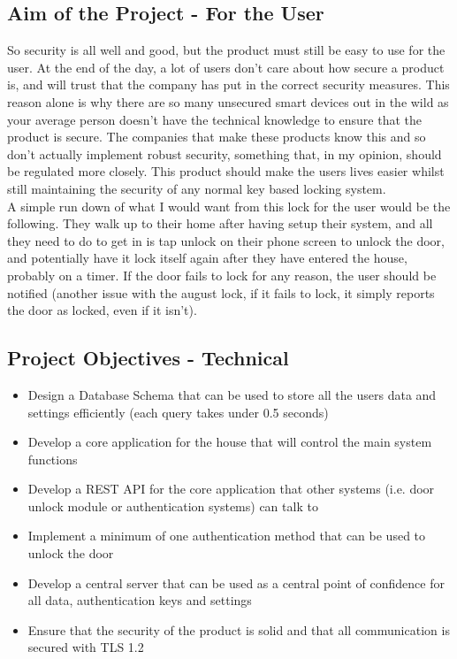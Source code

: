 \subsection{Aim of the Project - For the User}
So security is all well and good, but the product must still be easy to use for the user. At the end of the day, a lot of users don't care about how secure a product is, and will trust that the company has put in the correct security measures. This reason alone is why there are so many unsecured smart devices out in the wild as your average person doesn't have the technical knowledge to ensure that the product is secure. The companies that make these products know this and so don't actually implement robust security, something that, in my opinion, should be regulated more closely. This product should make the users lives easier whilst still maintaining the security of any normal key based locking system.
\\
\indent A simple run down of what I would want from this lock for the user would be the following. They walk up to their home after having setup their system, and all they need to do to get in is tap unlock on their phone screen to unlock the door, and potentially have it lock itself again after they have entered the house, probably on a timer. If the door fails to lock for any reason, the user should be notified (another issue with the august lock, if it fails to lock, it simply reports the door as locked, even if it isn't).

\subsection{Project Objectives - Technical}
\begin{itemize}
	\item Design a Database Schema that can be used to store all the users data and settings efficiently (each query takes under 0.5 seconds)
	\item Develop a core application for the house that will control the main system functions
	\item Develop a REST API for the core application that other systems (i.e. door unlock module or authentication systems) can talk to
	\item Implement a minimum of one authentication method that can be used to unlock the door
	\item Develop a central server that can be used as a central point of confidence for all data, authentication keys and settings
	\item Ensure that the security of the product is solid and that all communication is secured with TLS 1.2
\end{itemize}

